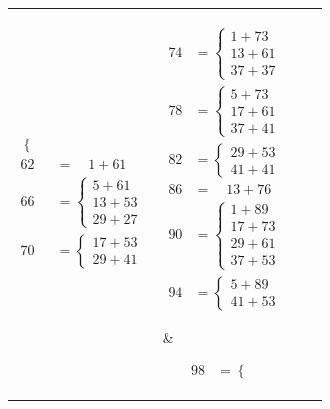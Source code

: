 \documentclass[12pt]{article}
\begin{document}
\begin{tabular}{l|l|l|l}
{\begin{align*}
\begin{cases}
        \end{cases} \\
        62 &= \quad \! 1 + 61 \\
        66 &= \begin{cases}
           5 + 61 \\ 13 + 53 \\ 29 + 27
        \end{cases} \\
        70 &= \begin{cases}
           17 + 53 \\ 29 + 41
        \end{cases} 
    \end{align*}} &
\parbox[t]{0.2\linewidth}{%
    \vspace*{-\baselineskip}
    \begin{align*} 
        74 &= \begin{cases}
           1 + 73 \\ 13 + 61 \\ 37 + 37
        \end{cases} \\
        78 &= \begin{cases}
           5 + 73 \\ 17 + 61 \\ 37 + 41
        \end{cases} \\
        82 &= \begin{cases}
           29 + 53 \\ 41 + 41
        \end{cases} \\
        86 &= \quad \! 13 + 76 \\
        90 &= \begin{cases}
           1 + 89 \\ 17 + 73 \\ 29 + 61 \\ 37 + 53
        \end{cases} \\
        94 &= \begin{cases}
           5 + 89 \\ 41 + 53
        \end{cases} 
    \end{align*}} &  
\parbox[t]{0.2\linewidth}{%
    \vspace*{-\baselineskip}
    \begin{align*} 
        98 &= \begin{cases}

\end{cases}
\end{align*}}
\end{tabular}
\end{document}
